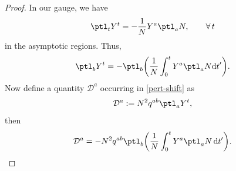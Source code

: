 \begin{proof}
In our gauge, we have
\begin{align*}
\ptl_t Y^t = - \frac{1}{N} Y^a\ptl_a N, \qquad \forall\, t
\end{align*}
in the asymptotic regions.
Thus,
\begin{align*}
\ptl_b Y^t = - \ptl_b \biggl(\frac{1}{N} \int^t_{0} Y^a \ptl_a N {\rm d}t' \biggr).
\end{align*}
Now define a quantity $\mathcal{D}^a $ occurring in \eqref{pert-shift} as
\begin{align*}
\mathcal{D}^a := N^2 q^{ab} \ptl_a Y^t,
\end{align*}
then
\begin{align*}
\mathcal{D}^a = - N^2 q^{ab} \ptl_b \biggl(\frac{1}{N} \int^t_{0} Y^a \ptl_a N \,{\rm d}t'\biggr).
\end{align*}


\end{proof}
